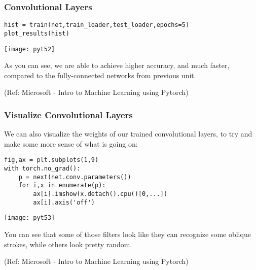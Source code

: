 \begin{frame}[fragile] \frametitle{Convolutional Layers}


\begin{lstlisting}
hist = train(net,train_loader,test_loader,epochs=5)
plot_results(hist)
\end{lstlisting}

\begin{center}
\texttt{[image: pyt52]}
\end{center}


As you can see, we are able to achieve higher accuracy, and much faster, compared to the fully-connected networks from previous unit.

\tiny{(Ref: Microsoft - Intro to Machine Learning using Pytorch)}
\end{frame}

\begin{frame}[fragile] \frametitle{Visualize Convolutional Layers}

We can also visualize the weights of our trained convolutional layers, to try and make some more sense of what is going on:

\begin{lstlisting}
fig,ax = plt.subplots(1,9)
with torch.no_grad():
    p = next(net.conv.parameters())
    for i,x in enumerate(p):
        ax[i].imshow(x.detach().cpu()[0,...])
        ax[i].axis('off')
\end{lstlisting}

\begin{center}
\texttt{[image: pyt53]}
\end{center}


You can see that some of those filters look like they can recognize some oblique strokes, while others look pretty random.

\tiny{(Ref: Microsoft - Intro to Machine Learning using Pytorch)}
\end{frame}


